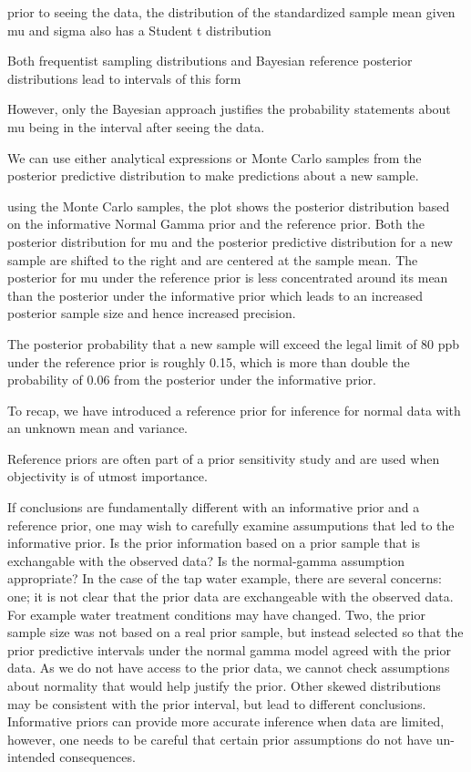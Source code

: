 \documentclass[]{book}
\theoremstyle{definition}
\theoremstyle{definition}
\theoremstyle{definition}
\theoremstyle{remark}
\begin{document}
prior to seeing the data, the distribution of the standardized sample
mean given mu and sigma also has a Student t distribution

Both frequentist sampling distributions and Bayesian reference posterior
distributions lead to intervals of this form

However, only the Bayesian approach justifies the probability statements
about mu being in the interval after seeing the data.

We can use either analytical expressions or Monte Carlo samples from the
posterior predictive distribution to make predictions about a new
sample.

using the Monte Carlo samples, the plot shows the posterior distribution
based on the informative Normal Gamma prior and the reference prior.
Both the posterior distribution for mu and the posterior predictive
distribution for a new sample are shifted to the right and are centered
at the sample mean. The posterior for mu under the reference prior is
less concentrated around its mean than the posterior under the
informative prior which leads to an increased posterior sample size and
hence increased precision.

The posterior probability that a new sample will exceed the legal limit
of 80 ppb under the reference prior is roughly 0.15, which is more than
double the probability of 0.06 from the posterior under the informative
prior.

To recap, we have introduced a reference prior for inference for normal
data with an unknown mean and variance.

Reference priors are often part of a prior sensitivity study and are
used when objectivity is of utmost importance.

If conclusions are fundamentally different with an informative prior and
a reference prior, one may wish to carefully examine assumputions that
led to the informative prior. Is the prior information based on a prior
sample that is exchangable with the observed data? Is the normal-gamma
assumption appropriate? In the case of the tap water example, there are
several concerns: one; it is not clear that the prior data are
exchangeable with the observed data. For example water treatment
conditions may have changed. Two, the prior sample size was not based on
a real prior sample, but instead selected so that the prior predictive
intervals under the normal gamma model agreed with the prior data. As we
do not have access to the prior data, we cannot check assumptions about
normality that would help justify the prior. Other skewed distributions
may be consistent with the prior interval, but lead to different
conclusions. Informative priors can provide more accurate inference when
data are limited, however, one needs to be careful that certain prior
assumptions do not have un-intended consequences.
\end{document}
